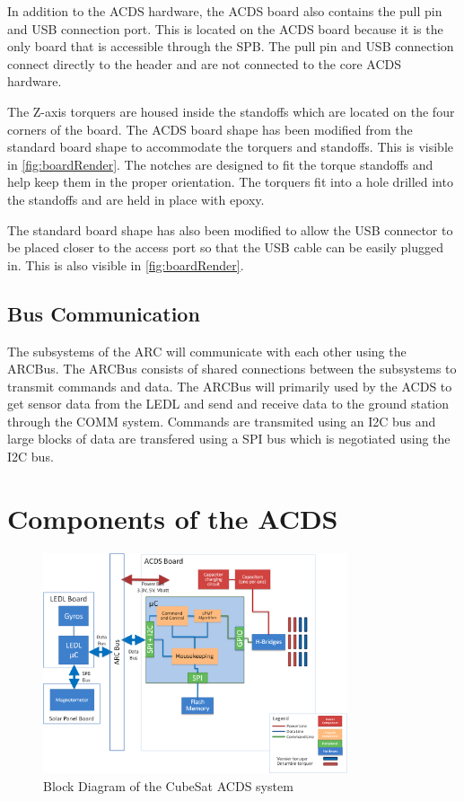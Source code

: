 In addition to the \ac{ACDS} hardware, the \ac{ACDS} board also contains the pull pin and \ac{USB} connection port. This is located on the \ac{ACDS} board because it is the only board that is accessible through the \ac{SPB}. The pull pin and \ac{USB} connection connect directly to the header and are not connected to the core \ac{ACDS} hardware. 

The Z-axis torquers are housed inside the standoffs which are located on the four corners of the board. The \ac{ACDS} board shape has been modified from the standard board shape to accommodate the torquers and standoffs. This is visible in \cref{fig:boardRender}. The notches are designed to fit the torque standoffs and help keep them in the proper orientation. The torquers fit into a hole drilled into the standoffs and are held in place with epoxy. 

The standard board shape has also been modified to allow the \ac{USB} connector to be placed closer to the access port so that the \ac{USB} cable can be easily plugged in. This is also visible in \cref{fig:boardRender}.

\subsection{Bus Communication}

The subsystems of the \ac{ARC} will communicate with each other using the ARCBus. The ARCBus consists of shared connections between the subsystems to transmit commands and data. The ARCBus will primarily used by the \ac{ACDS} to get sensor data from the \ac{LEDL} and send and receive data to the ground station through the COMM system. Commands are transmited using an \ac{I2C} bus and large blocks of data are transfered using a \ac{SPI} bus which is negotiated using the \ac{I2C} bus.

\section{Components of the \acl{ACDS}}

\begin{figure}[ht]
    \centering
    \includegraphics[width=0.8\textwidth]{Figures/Block}
    \caption{Block Diagram of the CubeSat \acs{ACDS} system}
    \label{fig:ACDS-block}
\end{figure}

